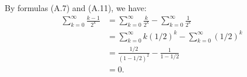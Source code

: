 \exercise
By formulas (A.7) and (A.11), we have:
\begin{align*}
    \sum_{k=0}^\infty\frac{k-1}{2^k} &= \sum_{k=0}^\infty\frac{k}{2^k} - \sum_{k=0}^\infty\frac{1}{2^k} \\
    &= \sum_{k=0}^\infty k(1/2)^k - \sum_{k=0}^\infty(1/2)^k \\
    &= \frac{1/2}{(1-1/2)^2} - \frac{1}{1-1/2} \\
    &= 0.
\end{align*}
